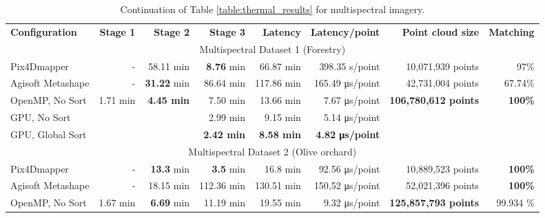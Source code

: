 \renewcommand{\arraystretch}{1.2}
\begin{table}
    \centering
    \footnotesize
    \caption{Continuation of Table \ref{table:thermal_results} for multispectral imagery.\\ }
    \label{table:multispectral_results}
    \begin{tabular}{l@{\hskip 0.25in}|rrr|r|r|r|r}
    \toprule
    \textbf{Configuration} & \textbf{Stage 1} & \textbf{Stage 2} & \textbf{Stage 3} & \textbf{Latency} & \textbf{Latency/point} & \textbf{Point cloud size} & \textbf{Matching}\\
    \cmidrule{1-8}
    \multicolumn{8}{c}{Multispectral Dataset 1 (Forestry)}\\
    \cmidrule{1-8}
    Pix4Dmapper & - & 58.11 \si{\minute} & \textbf{8.76} \si{\minute} & 66.87 \si{\minute} & 398.35 \si{\second}/point & 10,071,939 points & 97\%\\
    Agisoft Metashape & - & \textbf{31.22} \si{\minute} & 86.64 \si{\minute} & 117.86 \si{\minute} & 165.49 \si{\micro\second}/point & 42,731,004 points & 67.74\%\\
    \cmidrule{1-8}
    OpenMP, No Sort & \multirow{\numExperiments}{*}{1.71 \si{\minute}} & \multirow{\numExperiments}{*}{\textbf{4.45 \si{\minute}}} & 7.50 \si{\minute} & 13.66 \si{\minute} & 7.67 \si{\micro\second}/point & \multirow{\numExperiments}{*}{\textbf{106,780,612 points}} & \multirow{\numExperiments}{*}{\textbf{100\%}}\\
    GPU, No Sort & & & 2.99 \si{\minute} & 9.15 \si{\minute} & 5.14 \si{\micro\second}/point & &\\
    GPU, Global Sort & & & \textbf{2.42 \si{\minute}} & \textbf{8.58 \si{\minute}} & \textbf{4.82 \si{\micro\second}/point} & &\\
    \bottomrule
    \toprule
    \multicolumn{8}{c}{Multispectral Dataset 2 (Olive orchard)}\\
    \cmidrule{1-8}
    Pix4Dmapper & - & \textbf{13.3} \si{\minute} & \textbf{3.5} \si{\minute} & 16.8 \si{\minute} & 92.56 \si{\micro\second}/point & 10,889,523 points & \textbf{100\%}\\
    Agisoft Metashape & - & 18.15 \si{\minute} & 112.36 \si{\minute} & 130.51 \si{\minute} & 150,52 \si{\micro\second}/point & 52,021,396 points & \textbf{100\%}\\
    \cmidrule{1-8}
    OpenMP, No Sort & \multirow{\numExperiments}{*}{1.67 \si{\minute}} & \multirow{\numExperiments}{*}{\textbf{6.69} \si{\minute}} & 11.19 \si{\minute} & 19.55 \si{\minute} & 9.32 \si{\micro\second}/point & \multirow{\numExperiments}{*}{\textbf{125,857,793 points}} & \multirow{\numExperiments}{*}{99.934 \%}\\

\end{tabular}
\end{table}
